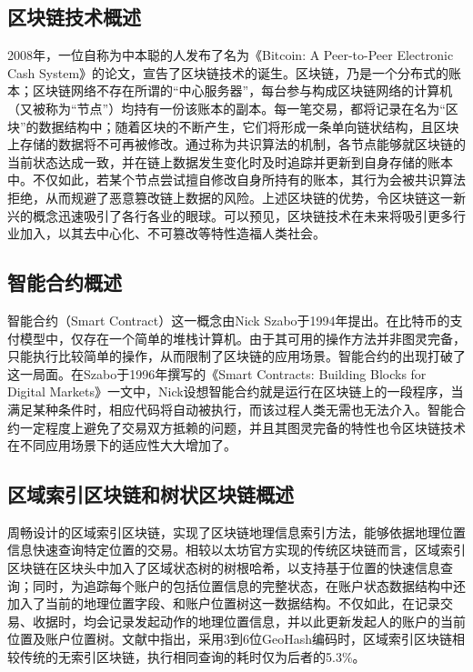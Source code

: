 \subsection{区块链技术概述}

2008年，一位自称为中本聪的人发布了名为《Bitcoin: A Peer-to-Peer Electronic Cash System》的论文\cite{bitcoin}，宣告了区块链技术的诞生。区块链，乃是一个分布式的账本；区块链网络不存在所谓的“中心服务器”，每台参与构成区块链网络的计算机（又被称为“节点”）均持有一份该账本的副本。每一笔交易，都将记录在名为“区块”的数据结构中；随着区块的不断产生，它们将形成一条单向链状结构，且区块上存储的数据将不可再被修改。通过称为共识算法的机制，各节点能够就区块链的当前状态达成一致，并在链上数据发生变化时及时追踪并更新到自身存储的账本中\cite{9376868}。不仅如此，若某个节点尝试擅自修改自身所持有的账本，其行为会被共识算法拒绝，从而规避了恶意篡改链上数据的风险\cite{bcApplication}。上述区块链的优势，令区块链这一新兴的概念迅速吸引了各行各业的眼球。可以预见，区块链技术在未来将吸引更多行业加入，以其去中心化、不可篡改等特性造福人类社会。

\subsection{智能合约概述}

智能合约（Smart Contract）这一概念由Nick Szabo于1994年提出。在比特币的支付模型中，仅存在一个简单的堆栈计算机。由于其可用的操作方法并非图灵完备，只能执行比较简单的操作，从而限制了区块链的应用场景\cite{bcStudy}。智能合约的出现打破了这一局面。在Szabo于1996年撰写的《Smart Contracts: Building Blocks for Digital Markets》一文\cite{nickSzabo}中，Nick设想智能合约就是运行在区块链上的一段程序，当满足某种条件时，相应代码将自动被执行，而该过程人类无需也无法介入。智能合约一定程度上避免了交易双方抵赖的问题，并且其图灵完备的特性也令区块链技术在不同应用场景下的适应性大大增加了。

\subsection{区域索引区块链和树状区块链概述}

周畅设计的区域索引区块链，实现了区块链地理信息索引方法，能够依据地理位置信息快速查询特定位置的交易\cite{sensors}。相较以太坊官方实现的传统区块链而言，区域索引区块链在区块头中加入了区域状态树的树根哈希，以支持基于位置的快速信息查询；同时，为追踪每个账户的包括位置信息的完整状态，在账户状态数据结构中还加入了当前的地理位置字段、和账户位置树这一数据结构。不仅如此，在记录交易、收据时，均会记录发起动作的地理位置信息，并以此更新发起人的账户的当前位置及账户位置树。文献\cite{sensors}中指出，采用3到6位GeoHash编码时，区域索引区块链相较传统的无索引区块链，执行相同查询的耗时仅为后者的5.3\%。

